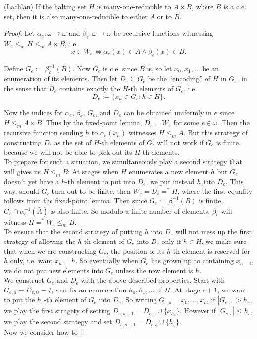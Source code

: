 \begin{theorem}
  (Lachlan) If the halting set $H$ is many-one-reducible to $A\times B$,
  where $B$ is a c.e. set, then it is also many-one-reducible to either $A$
  or to $B$.
\end{theorem}
\begin{proof}
  Let $\alpha_e:\omega \rightarrow\omega$ and $\beta_e:\omega
  \rightarrow\omega$ be recursive functions witnessing $W_e\leq_m H\leq_m
  A\times B$, i.e.
  \[x\in W_e \Leftrightarrow \alpha_e(x)\in A \wedge \beta_e(x)\in B.\]

  Define $G_e:=\beta_e^{-1}(B)$. Now $G_e$ is c.e. since $B$ is, so let
  $x_0,x_1,\ldots$ be an enumeration of its elements. Then let
  $D_e\subseteq G_e$ be the ``encoding'' of $H$ in $G_e$, in the sense that
  $D_e$ contains exactly the $H$-th elements of $G_e$, i.e.
  \[D_e :=\{x_h\in G_e: h\in H\}.\]

  Now the indices for $\alpha_e$, $\beta_e$, $G_e$, and $D_e$ can be
  obtained uniformly in $e$ since $H\leq_m A\times B$. Thus by the
  fixed-point lemma, $D_e=W_e$ for some $e\in\omega$. Then the recursive
  function sending $h$ to $\alpha_e(x_h)$ witnesses $H\leq_m A$. But this
  strategy of constructing $D_e$ as the set of $H$-th elements of $G_e$
  will not work if $G_e$ is finite, because we will not be able to pick out
  its $H$-th elements.\\

  To prepare for such a situation, we simultaneously play a second strategy
  that will gives us $H\leq_m B$: At stages when $H$ enumerates a new
  element $h$ but $G_e$ doesn't yet have a $h$-th element to put into
  $D_e$, we put instead $h$ into $D_e$. This way, should $G_e$ turn out to
  be finite, then $W_e=D_e=^*H$, where the first equality follows from the
  fixed-point lemma. Then since $G_e:=\beta_e^{-1}(B)$ is finite,
  $G_e\cap \alpha_e^{-1}(\bar{A})$ is also finite. So modulo a finite
  number of elements, $\beta_e$ will witness $H=^*W_e\leq_m B$.\\

  To ensure that the second strategy of putting $h$ into $D_e$ will not
  mess up the first strategy of allowing the $h$-th element of $G_e$ into
  $D_e$ only if $h\in H$, we make sure that when we are constructing $G_e$,
  the position of its $h$-th element is reserved for $h$ only, i.e. want
  $x_h=h$. So eventually when $G_e$ has grown up to containing $x_{h-1}$,
  we do not put new elements into $G_e$ unless the new element is $h$.\\

  We construct $G_e$ and $D_e$ with the above described properties. Start
  with $G_{e,0}=D_{e,0}=\emptyset$, and fix an enumeration $h_0,h_1,\ldots$
  of $H$. At stage $s+1$, we want to put the $h_s$-th element of $G_e$ into
  $D_e$. So writing $G_{e,s}=x_0,\ldots,x_n$, if $|G_{e,s}|>h_s$, we play
  the first stragety of setting $D_{e,s+1} =D_{e,s} \cup \{x_{h_s}\}$.
  However if $|G_{e,s}|\leq h_s$, we play the second strategy and set
  $D_{e,s+1} =D_{e,s} \cup \{h_s\}$.\\

  Now we consider how to 
\end{proof}
